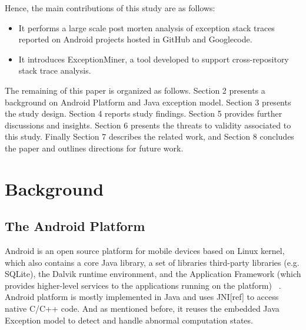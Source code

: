 \documentclass[conference]{IEEEtran}
\begin{document}
Hence, the main contributions of this study are as follows:
\begin{itemize}

  \item  It performs a large scale post morten analysis of exception stack traces reported on Android projects hosted in GitHub and Googlecode.

  \item  It introduces ExceptionMiner, a tool developed to support cross-repository stack trace
    analysis.

\end{itemize}



The remaining of this paper is organized as follows. Section 2 presents a
background on Android Platform and Java exception model. 
Section 3 presents the study design. Section 4 reports study findings. 
Section 5 provides further discussions and insights.
Section 6 presents the threats to validity associated to this study. Finally Section
7 describes the related work, and Section 8 concludes the paper and outlines
directions for future work.

\section{Background}

\subsection{The Android Platform} \label{sec:extypes}

Android is an open source platform for mobile devices based on Linux kernel,
which also contains  a core Java library, a set of libraries third-party libraries (e.g.  SQLite),
the Dalvik runtime environment, and the Application Framework (which provides 
higher-level services to the applications running on the platform) ~\cite{andguide}.
Android platform is mostly implemented in Java and uses JNI[ref] to access native C/C++ code. 
And as mentioned before, it reuses the embedded Java Exception model to detect and handle 
abnormal computation states.
\end{document}
